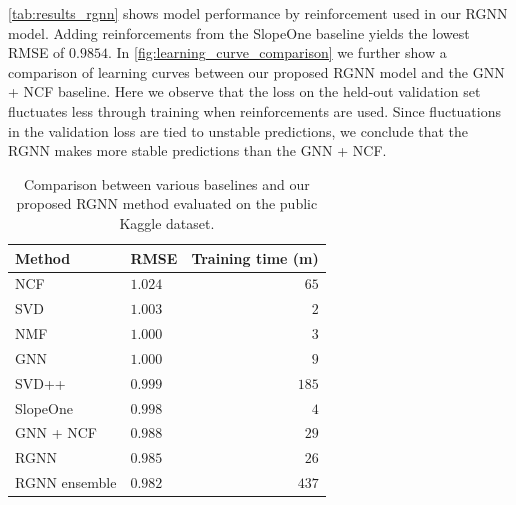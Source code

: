 \autoref{tab:results_rgnn} shows model performance by reinforcement used in our RGNN model. Adding reinforcements from the SlopeOne baseline yields the lowest RMSE of $0.9854$. In \autoref{fig:learning_curve_comparison} we further show a comparison of learning curves between our proposed RGNN model and the GNN + NCF baseline. Here we observe that the loss on the held-out validation set fluctuates less through training when reinforcements are used. Since fluctuations in the validation loss are tied to unstable predictions, we conclude that the RGNN makes more stable predictions than the GNN + NCF.

\begin{table}[]
\centering
\begin{tabular}{llr}
\hline
Method & \multicolumn{1}{l}{RMSE} & \multicolumn{1}{l}{Training time (m)} \\ \hline
NCF & $	1.024$ & $65$ \\
SVD & $1.003$ & \boldmath$2$ \\
NMF & $1.000$ & $3$ \\
GNN & $1.000$ & $9$ \\
SVD++ & $0.999$ & $185$ \\
SlopeOne & $0.998$ & $4$ \\
GNN + NCF & $0.988$ & $29$ \\
RGNN & $0.985$ & $26$ \\ 
RGNN ensemble & \boldmath$0.982$ & $437$ \\ \hline
\end{tabular}
\caption{Comparison between various baselines and our proposed RGNN method evaluated on the public Kaggle dataset.}
\label{tab:results}
\end{table}


